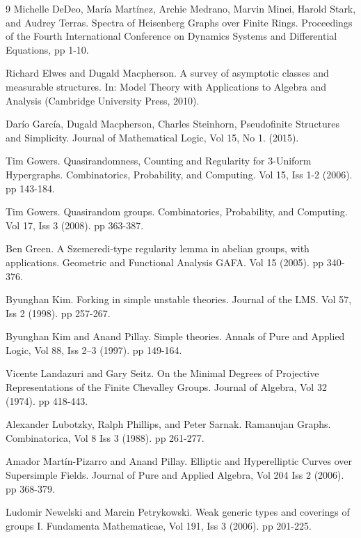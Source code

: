 \documentclass[10pt]{article}
\begin{document}
\begin{thebibliography}{9}
Michelle DeDeo, María Martínez, Archie Medrano, Marvin Minei, Harold Stark, and Audrey Terras. Spectra of Heisenberg Graphs over Finite Rings. Proceedings of the Fourth International Conference on Dynamics Systems and Differential Equations, pp 1-10.

Richard Elwes and Dugald Macpherson. A survey of asymptotic classes and measurable structures. In: Model Theory with Applications to Algebra and Analysis (Cambridge University Press, 2010).

Darío García, Dugald Macpherson, Charles Steinhorn, Pseudofinite Structures and Simplicity. Journal of Mathematical Logic, Vol 15, No 1. (2015).

Tim Gowers. Quasirandomness, Counting and Regularity for 3-Uniform Hypergraphs. Combinatorics, Probability, and Computing. Vol 15, Iss 1-2 (2006). pp 143-184.

Tim Gowers. Quasirandom groups. Combinatorics, Probability, and Computing. Vol 17, Iss 3 (2008). pp 363-387.

Ben Green. A Szemeredi-type regularity lemma in abelian groups, with applications. Geometric and Functional Analysis GAFA. Vol 15 (2005). pp 340-376.

Byunghan Kim. Forking in simple unstable theories. Journal of the LMS. Vol 57, Iss 2 (1998). pp 257-267.

Byunghan Kim and Anand Pillay. Simple theories. Annals of Pure and Applied Logic, Vol 88, Iss 2–3 (1997). pp 149-164.

Vicente Landazuri and Gary Seitz. On the Minimal Degrees of Projective Representations of the Finite Chevalley Groups. Journal of Algebra, Vol 32 (1974). pp 418-443.

Alexander Lubotzky, Ralph Phillips, and Peter Sarnak. Ramanujan Graphs. Combinatorica, Vol 8 Iss 3 (1988). pp 261-277.

Amador Martín-Pizarro and Anand Pillay. Elliptic and Hyperelliptic Curves over Supersimple Fields. Journal of Pure and Applied Algebra, Vol 204 Iss 2 (2006). pp 368-379.

Ludomir Newelski and Marcin Petrykowski. Weak generic types and coverings of
groups I. Fundamenta Mathematicae, Vol 191, Iss 3 (2006). pp 201-225.


\end{thebibliography}
\end{document}
